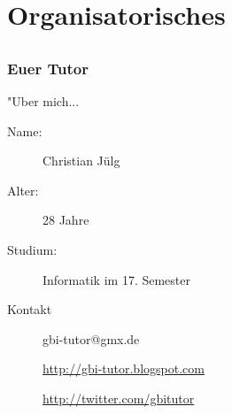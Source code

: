 













\section[Organisation]{Organisatorisches}
\subsection*{}
\begin{frame}
\frametitle{Euer Tutor}
        \begin{block}{"Uber mich...}
                \begin{description}
                        \item[Name:] Christian Jülg
                        \item[Alter:] 28 Jahre
                        \item[Studium:] Informatik im 17. Semester
                \end{description}
        \end{block}

        \vspace{2ex}

        \begin{block}{Kontakt}
                \begin{description}
                        \item[] gbi-tutor@gmx.de
                        \item[] \url{http://gbi-tutor.blogspot.com}
                        \item[] \url{http://twitter.com/gbitutor}
                \end{description}
        \end{block}
\end{frame}

